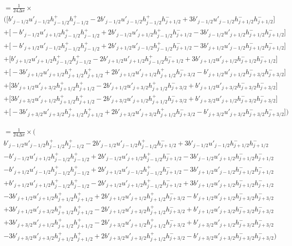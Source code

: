 \documentclass[12pt]{article}
\begin{document}
\begin{multline}
=  \frac{1}{24\Delta x} \times\\ \bigg(\bigg[b'_{j-1/2}u'_{j-1/2} h^+_{j-1/2}h^+_{j-1/2} - 2b'_{j-1/2}u'_{j-1/2}h^+_{j-1/2}h^-_{j+1/2} +3 b'_{j-1/2}u'_{j-1/2}h^-_{j+1/2}h^-_{j+1/2} \bigg] \\+\bigg[- b'_{j-1/2}u'_{j+1/2}h^+_{j-1/2}h^+_{j-1/2} + 2b'_{j-1/2}u'_{j+1/2}h^+_{j-1/2}h^-_{j+1/2} - 3b'_{j-1/2}u'_{j+1/2}h^-_{j+1/2}h^-_{j+1/2} \bigg] \\+\bigg[ -b'_{j+1/2} u'_{j-1/2}h^+_{j-1/2}h^+_{j-1/2}  + 2b'_{j+1/2} u'_{j-1/2}h^+_{j-1/2}h^-_{j+1/2} -3 b'_{j+1/2} u'_{j-1/2}h^-_{j+1/2}h^-_{j+1/2} \bigg]\\+ \bigg[ b'_{j+1/2}u'_{j+1/2}h^+_{j-1/2}h^+_{j-1/2} - 2b'_{j+1/2}u'_{j+1/2}h^+_{j-1/2}h^-_{j+1/2}+ 3b'_{j+1/2}u'_{j+1/2}h^-_{j+1/2}h^-_{j+1/2} \bigg] \\
+ \bigg[-3b'_{j+1/2}u'_{j+1/2} h^+_{j+1/2}h^+_{j+1/2}+ 2b'_{j+1/2}u'_{j+1/2} h^+_{j+1/2}h^-_{j+3/2} - b'_{j+1/2}u'_{j+1/2} h^-_{j+3/2}h^-_{j+3/2} \bigg] \\ + \bigg[3b'_{j+1/2}u'_{j+3/2}h^+_{j+1/2}h^+_{j+1/2} -2b'_{j+1/2}u'_{j+3/2}h^+_{j+1/2}h^-_{j+3/2}  + b'_{j+1/2}u'_{j+3/2}h^-_{j+3/2}h^-_{j+3/2}\bigg] \\+ \bigg[3b'_{j+3/2} u'_{j+1/2}h^+_{j+1/2}h^+_{j+1/2} - 2b'_{j+3/2} u'_{j+1/2}h^+_{j+1/2}h^-_{j+3/2} + b'_{j+3/2} u'_{j+1/2}h^-_{j+3/2}h^-_{j+3/2}\bigg] \\+ \bigg[-3b'_{j+3/2} u'_{j+3/2}h^+_{j+1/2}h^+_{j+1/2} + 2b'_{j+3/2} u'_{j+3/2}h^+_{j+1/2}h^-_{j+3/2} - b'_{j+3/2} u'_{j+3/2}h^-_{j+3/2}h^-_{j+3/2}\bigg] \bigg)
\end{multline}

\begin{multline}
=  \frac{1}{24\Delta x} \times \bigg(\\b'_{j-1/2}u'_{j-1/2} h^+_{j-1/2}h^+_{j-1/2} - 2b'_{j-1/2}u'_{j-1/2}h^+_{j-1/2}h^-_{j+1/2} +3 b'_{j-1/2}u'_{j-1/2}h^-_{j+1/2}h^-_{j+1/2}  \\- b'_{j-1/2}u'_{j+1/2}h^+_{j-1/2}h^+_{j-1/2} + 2b'_{j-1/2}u'_{j+1/2}h^+_{j-1/2}h^-_{j+1/2} - 3b'_{j-1/2}u'_{j+1/2}h^-_{j+1/2}h^-_{j+1/2}  \\ -b'_{j+1/2} u'_{j-1/2}h^+_{j-1/2}h^+_{j-1/2}  + 2b'_{j+1/2} u'_{j-1/2}h^+_{j-1/2}h^-_{j+1/2} -3 b'_{j+1/2} u'_{j-1/2}h^-_{j+1/2}h^-_{j+1/2} \\+  b'_{j+1/2}u'_{j+1/2}h^+_{j-1/2}h^+_{j-1/2} - 2b'_{j+1/2}u'_{j+1/2}h^+_{j-1/2}h^-_{j+1/2}+ 3b'_{j+1/2}u'_{j+1/2}h^-_{j+1/2}h^-_{j+1/2} \\
-3b'_{j+1/2}u'_{j+1/2} h^+_{j+1/2}h^+_{j+1/2}+ 2b'_{j+1/2}u'_{j+1/2} h^+_{j+1/2}h^-_{j+3/2} - b'_{j+1/2}u'_{j+1/2} h^-_{j+3/2}h^-_{j+3/2}  \\ + 3b'_{j+1/2}u'_{j+3/2}h^+_{j+1/2}h^+_{j+1/2} -2b'_{j+1/2}u'_{j+3/2}h^+_{j+1/2}h^-_{j+3/2}  + b'_{j+1/2}u'_{j+3/2}h^-_{j+3/2}h^-_{j+3/2} \\+ 3b'_{j+3/2} u'_{j+1/2}h^+_{j+1/2}h^+_{j+1/2} - 2b'_{j+3/2} u'_{j+1/2}h^+_{j+1/2}h^-_{j+3/2} + b'_{j+3/2} u'_{j+1/2}h^-_{j+3/2}h^-_{j+3/2} \\-3b'_{j+3/2} u'_{j+3/2}h^+_{j+1/2}h^+_{j+1/2} + 2b'_{j+3/2} u'_{j+3/2}h^+_{j+1/2}h^-_{j+3/2} - b'_{j+3/2} u'_{j+3/2}h^-_{j+3/2}h^-_{j+3/2} \bigg)
\end{multline}
\end{document}
